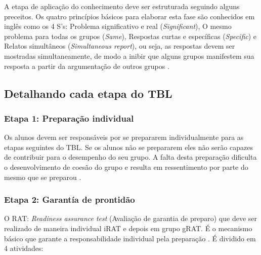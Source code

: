 A etapa de aplicação do conhecimento deve ser estruturada seguindo alguns preceitos. Os quatro princípios básicos para elaborar esta fase são conhecidos em inglês como os 4 S’s: Problema significativo e real (\textit{Significant}), O mesmo problema para todas os grupos (\textit{Same}), Respostas curtas e específicas (\textit{Specific}) e Relatos simultâneos (\textit{Simultaneous report}), ou seja, as respostas devem ser mostradas simultaneamente, de modo a inibir que alguns grupos manifestem sua resposta a partir da argumentação de outros grupos \cite{sweet}.

\subsection{Detalhando cada etapa do TBL}

\subsubsection{Etapa 1: Preparação individual}

Os alunos devem ser responsáveis por se prepararem individualmente para as etapas seguintes do TBL. Se os alunos não se prepararem eles não serão capazes de contribuir para o desempenho do seu grupo. A falta desta preparação dificulta o desenvolvimento de coesão do grupo e resulta em ressentimento por parte do mesmo que se preparou \cite{sweet}.

\subsubsection{Etapa 2: Garantía de prontidão}

O RAT: \textit{Readiness assurance test} (Avaliação de garantia de preparo) que deve ser realizado de maneira individual iRAT e depois em grupo gRAT. É o mecanismo básico que garante a responsabilidade individual pela preparação \cite{sweet}. É dividido em 4 atividades:

